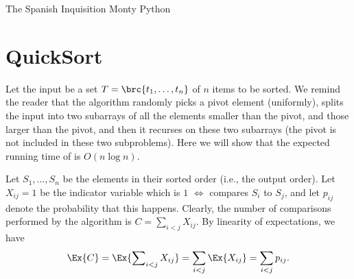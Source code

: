 \makeatletter
{}
\makeatother
\ifx\bookMode\undefined%
\fi





\ChapterPrefix{}
\ChapterGen{}

\noindent%
%
{The Spanish Inquisition}%
{ Monty Python}



\section{QuickSort}

Let the input be a set $T = \brc{t_1,\ldots,t_n}$ of $n$ items to be
sorted. We remind the reader that the \QuickSort{} algorithm randomly
picks a pivot element (uniformly), splits the input into two subarrays of
all the elements smaller than the pivot, and those larger than the pivot,
and then it recurses on these two subarrays (the pivot is not included in
these two subproblems). Here we will show that the expected running time
of \QuickSort is $O(n\log n)$.




Let $S_1, \ldots, S_n$ be the elements in their sorted order (i.e., the output
order).  Let $X_{ij}=1$ be the indicator variable which is $1$ $\iff$
\QuickSort{} compares $S_i$ to $S_j$, and let $p_{ij}$ denote the
probability that this happens. Clearly, the number of comparisons
performed by the algorithm is $C = \sum_{i<j} X_{ij}$.  By linearity of
expectations, we have
\begin{align*}
  \Ex{\bigl. C}%
  =%
  \Ex{ \sum\nolimits_{i < j} X_{ij}}%
  =%
  \sum_{i < j} \Ex{X_{ij}}%
  =%
  \sum_{i<j} p_{ij}.
\end{align*}

